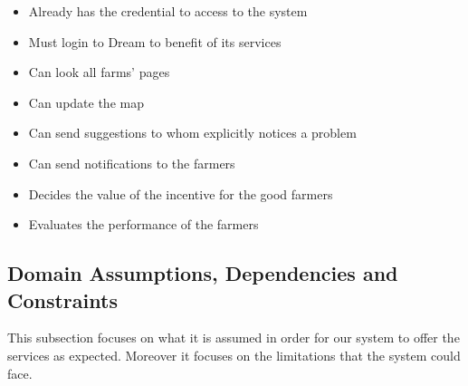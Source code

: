 \begin{itemize}
    \renewcommand\labelitemi{--}
    \item Already has the credential to access to the system
    \item Must login to Dream to benefit of its services
    \item Can look all farms' pages
    \item Can update the map
    \item Can send suggestions to whom explicitly notices a problem
    \item Can send notifications to the farmers
    \item Decides the value of the incentive for the good farmers
    \item Evaluates the performance of the farmers
\end{itemize}


\subsection{Domain Assumptions, Dependencies and Constraints}
This subsection focuses on what it is assumed in order for our system to offer the services as expected.
Moreover it focuses on the limitations that the system could face.

